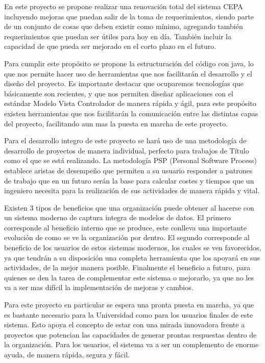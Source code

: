 \documentclass[a4paper,12pt,openany,oneside]{book}
\begin{document}
En este proyecto se propone realizar una renovación total del sistema CEPA incluyendo mejoras que puedan salir de la toma de requerimientos, siendo parte de un conjunto de cosas que deben existir como mínimo, agregando también requerimientos que puedan ser útiles para hoy en día. También incluir la capacidad de que pueda ser mejorado en el corto plazo en el futuro.

Para cumplir este propósito se propone la estructuración del código con java, lo que nos permite hacer uso de herramientas que nos facilitarán el desarrollo y el diseño del proyecto. Es importante destacar que ocuparemos tecnologías que básicamente son recientes, y que nos permiten diseñar aplicaciones con el estándar Modelo Vista Controlador de manera rápida y ágil, para este propósito existen herramientas que nos facilitarán la comunicación entre las distintas capas del proyecto, facilitando aun mas la puesta en marcha de este proyecto.

Para el desarrollo integro de este proyecto se hará uso de una metodología de desarrollo de proyectos de manera individual, perfecto para trabajos de Título como el que se está realizando. La metodología PSP (Personal Software Process) establece aristas de desempeño que permiten a su usuario responder a patrones de trabajo que en un futuro serán la base para calcular costes y tiempos que un ingeniero necesita para la realización de sus actividades de manera rápida y vital.

Existen 3 tipos de beneficios que una organización puede obtener al hacerse con un sistema moderno de captura integra de modelos de datos. El primero corresponde al beneficio interno que se produce, este conlleva una importante evolución de como se ve la organización por dentro. El segundo corresponde al beneficio de los usuarios de estos sistemas modernos, los cuales se ven favorecidos, ya que tendrán a su disposición una completa herramienta que los apoyará en sus actividades, de la mejor manera posible. Finalmente el beneficio a futuro, para quienes se den la tarea de complementar este sistema o mejorarlo, ya que no les va a ser mas difícil la implementación de mejoras y cambios.

Para este proyecto en particular se espera una pronta puesta en marcha, ya que es bastante necesario para la Universidad como para los usuarios finales de este sistema. Esto apoya el concepto de estar con una mirada innovadora frente a proyectos que potencian las capacidades de generar prontas respuestas dentro de la organización. Para los usuarios, el sistema va a ser un complemento de enorme ayuda, de manera rápida, segura y fácil.
\end{document}
